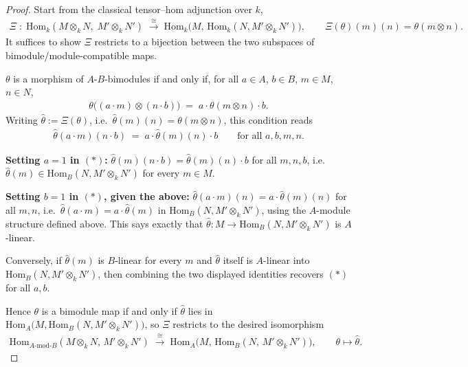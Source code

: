 \documentclass[11pt]{article}
\theoremstyle{definition}
\begin{document}
\begin{proof}
Start from the classical tensor--hom adjunction over $k$,
\begin{align}
\Xi \;:\; \mathrm{Hom}_k(M\otimes_k N,\; M'\otimes_k N')
\;\xrightarrow{\ \cong\ }\;
\mathrm{Hom}_k\big(M,\, \mathrm{Hom}_k(N, M'\otimes_k N')\big),
\qquad
\Xi(\theta)(m)(n) = \theta(m\otimes n).
\end{align}
It suffices to show $\Xi$ restricts to a bijection between the two subspaces of
bimodule/module-compatible maps.

\smallskip
$\theta$ is a morphism of $A$-$B$-bimodules if and only if, for all $a\in A$, $b\in B$,
$m \in M$, $n \in N$,
\begin{align}
\theta\big((a\cdot m)\otimes(n\cdot b)\big) \;=\; a\cdot\theta(m\otimes n)\cdot b.
\end{align}
Writing $\hat\theta := \Xi(\theta)$, i.e.\ $\hat\theta(m)(n) = \theta(m\otimes n)$, this
condition reads
\begin{align}
\hat\theta(a\cdot m)(n\cdot b) \;=\; a\cdot \hat\theta(m)(n)\cdot b
\qquad \text{for all } a,b,m,n. \tag{$\ast$}
\end{align}

\textbf{Setting $a = 1$ in $(\ast)$:} $\hat\theta(m)(n\cdot b) = \hat\theta(m)(n)\cdot b$
for all $m,n,b$, i.e.\ $\hat\theta(m) \in \mathrm{Hom}_B(N, M'\otimes_k N')$ for every
$m \in M$.

\textbf{Setting $b = 1$ in $(\ast)$, given the above:} $\hat\theta(a\cdot m)(n) =
a\cdot\hat\theta(m)(n)$ for all $m,n$, i.e.\
$\hat\theta(a\cdot m) = a\cdot\hat\theta(m)$ in $\mathrm{Hom}_B(N,M'\otimes_k N')$,
using the $A$-module structure defined above. This says exactly that
$\hat\theta : M \to \mathrm{Hom}_B(N, M'\otimes_k N')$ is $A$-linear.

Conversely, if $\hat\theta(m)$ is $B$-linear for every $m$ and $\hat\theta$ itself is
$A$-linear into $\mathrm{Hom}_B(N,M'\otimes_kN')$, then combining the two displayed
identities recovers $(\ast)$ for all $a,b$.

\smallskip
Hence $\theta$ is a bimodule map if and only if $\hat\theta$ lies in
$\mathrm{Hom}_A\big(M, \mathrm{Hom}_B(N, M'\otimes_k N')\big)$, so $\Xi$ restricts to
the desired isomorphism
\begin{align}
\mathrm{Hom}_{A\text{-}\mathrm{mod}\text{-}B}(M\otimes_kN,\, M'\otimes_kN')
\;\xrightarrow{\ \cong\ }\;
\mathrm{Hom}_A\big(M,\, \mathrm{Hom}_B(N,\, M'\otimes_kN')\big),
\qquad \theta \longmapsto \hat\theta. \tag*{$\blacksquare$}
\end{align}
\end{proof}
\end{document}
